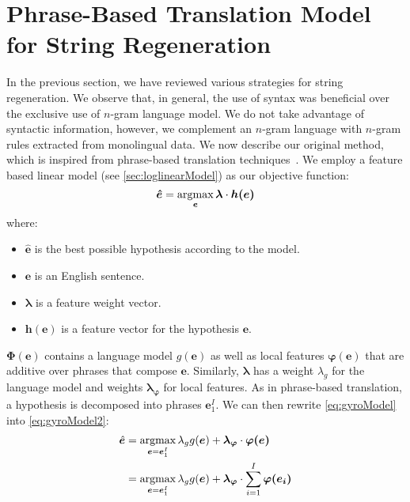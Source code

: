 
\section{Phrase-Based Translation Model for String Regeneration}
\label{sec:gyroPhraseBasedModel}

In the previous section, we have reviewed various strategies for string
regeneration. We observe that, in general, the use of syntax was beneficial
over the exclusive use of $n$-gram language model. We do not take advantage
of syntactic information, however, we complement an $n$-gram language
with $n$-gram rules extracted from monolingual data. We now describe our original method, which is inspired from
phrase-based translation techniques~\citep{koehn:2010:book}.
We employ a feature based linear model (see \autoref{sec:loglinearModel}) as our
objective function:
%
\begin{equation}
  \bm{\hat{e}} = \operatorname*{argmax}_{\bm{e}} \bm{\lambda} \cdot \bm{h(e)}
  \label{eq:gyroModel}
\end{equation}
%
where:
%
\begin{itemize}
  \item $\bm{\hat{e}}$ is the best possible hypothesis according to the model.
  \item $\bm{e}$ is an English sentence.
  \item $\bm{\lambda}$ is a feature weight vector.
  \item $\bm{h(e)}$ is a feature vector for the hypothesis $\bm{e}$.
\end{itemize}
%
$\bm{\Phi}(\bm{e})$ contains a language model
$g(\bm{e})$ as well as local features $\bm{\varphi(e)}$
that are additive over phrases that compose $\bm{e}$.
Similarly, $\bm{\lambda}$ has a weight $\lambda_g$ for the language model
and weights $\bm{\lambda_{\varphi}}$ for local features. As in phrase-based
translation, a hypothesis
is decomposed into phrases $\bm{e}_1^I$. We can then rewrite
\autoref{eq:gyroModel} into \autoref{eq:gyroModel2}:
%
\begin{equation}
  \begin{split}
    \hat{\bm{e}} &= \operatorname*{argmax}_{\bm{e} = \bm{e}_1^I} \lambda_{g} g(\bm{e}) + \bm{\lambda_{\varphi}} \cdot \bm{\varphi(e)} \\
                 &= \operatorname*{argmax}_{\bm{e} = \bm{e}_1^I} \lambda_{g} g(\bm{e}) + \bm{\lambda_{\varphi}} \cdot \sum_{i = 1}^I \bm{\varphi(e_i)} \\
  \end{split}
  \label{eq:gyroModel2}
\end{equation}
